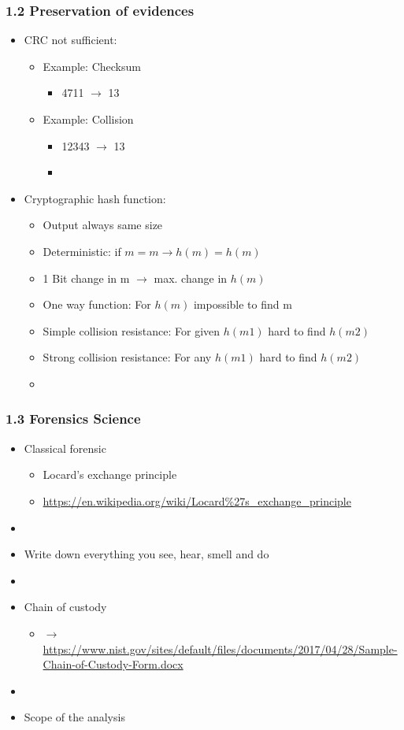 \begin{frame}
  \frametitle{1.2 Preservation of evidences}
  \begin{itemize}
      \item CRC not sufficient:
      \begin{itemize}
          \item Example: Checksum
          \begin{itemize}
		  \item[] 4711 $\to$ 13
          \end{itemize}
          \item Example: Collision
          \begin{itemize}
		  \item[] 12343 $\to$ 13
		  \item[] 
          \end{itemize}
      \end{itemize}
      \item Cryptographic hash function:
      \begin{itemize}
          \item Output always same size
	  \item Deterministic: if $m = m \to h(m) = h(m)$
	  \item 1 Bit change in m $\to$ max. change in $h(m)$
	  \item One way function: For $h(m)$ impossible to find m
	  \item Simple collision resistance: For given $h(m1)$ hard to find $h(m2)$
	  \item Strong collision resistance: For any $h(m1)$ hard to find $h(m2)$
	  \item[]
      \end{itemize}
  \end{itemize}
\end{frame}


\begin{frame}
  \frametitle{1.3 Forensics Science}
  \begin{itemize}
    \item Classical forensic
    \begin{itemize}
      \item[] Locard's exchange principle
      \item[] {\scriptsize \url{https://en.wikipedia.org/wiki/Locard\%27s\_exchange\_principle}}
    \end{itemize}
    \item[]
    \item Write down everything you see, hear, smell and do
    \item[]
    \item Chain of custody
    \begin{itemize}
        \item[] $\to$ {\scriptsize \url{https://www.nist.gov/sites/default/files/documents/2017/04/28/Sample-Chain-of-Custody-Form.docx}}
    \end{itemize}
    \item[]
    \item Scope of the analysis
  \end{itemize}
\end{frame}


